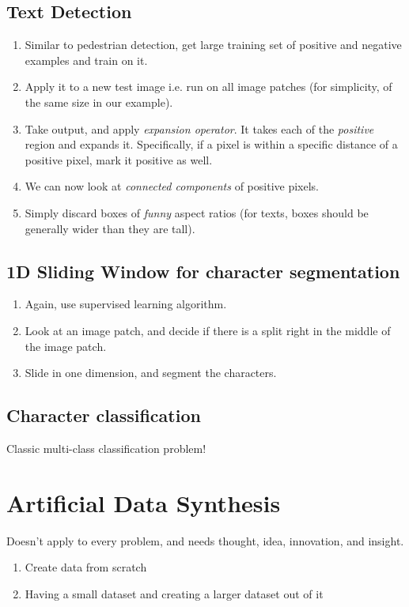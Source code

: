 \subsection{Text Detection}
\begin{enumerate}
	\item Similar to pedestrian detection, get large training set of positive
	      and negative examples and train on it.
	\item Apply it to a new test image i.e. run on all image patches (for simplicity,
	      of the same size in our example).
	\item Take output, and apply \emph{expansion operator}. It takes each of the \emph{positive}
	      region and expands it. Specifically, if a pixel is within a specific distance
	      of a positive pixel, mark it positive as well.
	\item We can now look at \emph{connected components} of positive pixels.
	\item Simply discard boxes of \emph{funny} aspect ratios (for texts, boxes should be
	      generally wider than they are tall).
\end{enumerate}

\subsection{1D Sliding Window for character segmentation}
\begin{enumerate}
	\item Again, use supervised learning algorithm.
	\item Look at an image patch, and decide if there is a split right in the middle
	      of the image patch.
	\item Slide in one dimension, and segment the characters.
\end{enumerate}

\subsection{Character classification}
Classic multi-class classification problem!

\section{Artificial Data Synthesis}
Doesn't apply to every problem, and needs thought, idea, innovation, and insight.
\begin{enumerate}
	\item Create data from scratch
	\item Having a small dataset and creating a larger dataset out of it
\end{enumerate}

